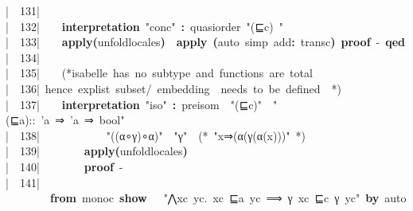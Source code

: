 \documentclass{article}
\newcommand{\syntaxCOMMENTA}[1]{\textcolor[rgb]{0.8,0.0,0.0}{#1}}
\newcommand{\syntaxKEYWORDA}[1]{\textcolor[rgb]{0.0,0.4,0.6}{\textbf{#1}}}
\newcommand{\syntaxKEYWORDC}[1]{\textcolor[rgb]{0.0,0.6,1.0}{\textbf{#1}}}
\newcommand{\syntaxLITERALA}[1]{\textcolor[rgb]{1.0,0.0,0.8}{#1}}
\newcommand{\syntaxOPERATOR}[1]{\textcolor[rgb]{0.0,0.0,0.0}{\textbf{#1}}}
\newcommand{\syntaxCOMMENTA}[1]{\textcolor[rgb]{0.8,0.0,0.0}{#1}}
\newcommand{\syntaxKEYWORDA}[1]{\textcolor[rgb]{0.0,0.4,0.6}{\textbf{#1}}}
\newcommand{\syntaxKEYWORDC}[1]{\textcolor[rgb]{0.0,0.6,1.0}{\textbf{#1}}}
\newcommand{\syntaxLITERALA}[1]{\textcolor[rgb]{1.0,0.0,0.8}{#1}}
\newcommand{\syntaxOPERATOR}[1]{\textcolor[rgb]{0.0,0.0,0.0}{\textbf{#1}}}
\newcommand{\syntaxCOMMENTA}[1]{\textcolor[rgb]{0.8,0.0,0.0}{#1}}
\newcommand{\syntaxKEYWORDA}[1]{\textcolor[rgb]{0.0,0.4,0.6}{\textbf{#1}}}
\newcommand{\syntaxKEYWORDC}[1]{\textcolor[rgb]{0.0,0.6,1.0}{\textbf{#1}}}
\newcommand{\syntaxLITERALA}[1]{\textcolor[rgb]{1.0,0.0,0.8}{#1}}
\newcommand{\syntaxOPERATOR}[1]{\textcolor[rgb]{0.0,0.0,0.0}{\textbf{#1}}}
\newcommand{\syntaxCOMMENTA}[1]{\textcolor[rgb]{0.8,0.0,0.0}{\textbf{#1}}}
\newcommand{\syntaxKEYWORDA}[1]{\textcolor[rgb]{0.0,0.4,0.6}{#1}}
\newcommand{\syntaxKEYWORDC}[1]{\textcolor[rgb]{0.0,0.6,1.0}{#1}}
\newcommand{\syntaxLITERALA}[1]{\textcolor[rgb]{1.0,0.0,0.8}{\textbf{#1}}}
\newcommand{\syntaxOPERATOR}[1]{\textcolor[rgb]{0.0,0.0,0.0}{#1}}
\newcommand{\syntaxCOMMENTA}[1]{\textcolor[rgb]{0.8,0.0,0.0}{#1}}
\newcommand{\syntaxKEYWORDA}[1]{\textcolor[rgb]{0.0,0.4,0.6}{\textbf{#1}}}
\newcommand{\syntaxKEYWORDC}[1]{\textcolor[rgb]{0.0,0.6,1.0}{\textbf{#1}}}
\newcommand{\syntaxLITERALA}[1]{\textcolor[rgb]{1.0,0.0,0.8}{#1}}
\newcommand{\syntaxOPERATOR}[1]{\textcolor[rgb]{0.0,0.0,0.0}{\textbf{#1}}}
\newcommand{\syntaxCOMMENTA}[1]{\textcolor[rgb]{0.8,0.0,0.0}{#1}}
\newcommand{\syntaxKEYWORDA}[1]{\textcolor[rgb]{0.0,0.4,0.6}{\textbf{#1}}}
\newcommand{\syntaxKEYWORDC}[1]{\textcolor[rgb]{0.0,0.6,1.0}{\textbf{#1}}}
\newcommand{\syntaxLITERALA}[1]{\textcolor[rgb]{1.0,0.0,0.8}{#1}}
\newcommand{\syntaxOPERATOR}[1]{\textcolor[rgb]{0.0,0.0,0.0}{\textbf{#1}}}
\newcommand{\syntaxCOMMENTA}[1]{\textcolor[rgb]{0.0,0.0,0.0}{#1}}
\newcommand{\syntaxKEYWORDA}[1]{\textcolor[rgb]{0.0,0.0,0.0}{#1}}
\newcommand{\syntaxKEYWORDC}[1]{\textcolor[rgb]{0.0,0.0,0.0}{#1}}
\newcommand{\gutter}[1]{\textcolor[rgb]{0,0,0}{{|}#1}}
\newcommand{\gutterH}[1]{\textcolor[rgb]{1,0,0}{{|}#1}}
\begin{document}
\gutter{\ \ 131{|}\ }{\ }{\ }{\ }\hspace*{\fill}\\
\gutter{\ \ 132{|}\ }{\ }{\ }{\ }\syntaxKEYWORDA{interpretation}{\ }\syntaxLITERALA{"conc"}{\ }\syntaxOPERATOR{:}{\ }quasi\usebox{\underscorebox}order{\ }\syntaxLITERALA{"(⊑c){\ }"}{\ }\hspace*{\fill}\\
\gutter{\ \ 133{|}\ }{\ }{\ }{\ }\syntaxKEYWORDA{apply}\syntaxOPERATOR{(}unfold\usebox{\underscorebox}locales\syntaxOPERATOR{)}{\ }{\ }\syntaxKEYWORDA{apply}{\ }\syntaxOPERATOR{(}auto{\ }simp{\ }add\syntaxOPERATOR{:}{\ }transc\syntaxOPERATOR{)}{\ }\syntaxKEYWORDA{proof}{\ }{-}{\ }\syntaxKEYWORDA{qed}\hspace*{\fill}\\
\gutter{\ \ 134{|}\ }\hspace*{\fill}\\
\gutterH{\ \ 135{|}\ }{\ }{\ }{\ }\syntaxCOMMENTA{(*isabelle{\ }has{\ }no{\ }subtype{\ }and{\ }functions{\ }are{\ }total}\hspace*{\fill}\\
\gutter{\ \ 136{|}\ }\syntaxCOMMENTA{hence{\ }explist{\ }subset/{\ }embedding{\ }{\ }needs{\ }to{\ }be{\ }defined{\ }{\ }*)}\hspace*{\fill}\\
\gutter{\ \ 137{|}\ }{\ }{\ }{\ }\syntaxKEYWORDA{interpretation}{\ }\syntaxLITERALA{"iso"}{\ }\syntaxOPERATOR{:}{\ }pre\usebox{\underscorebox}isom{\ }{\ }\syntaxLITERALA{"(⊑c)"}{\ }{\ }\syntaxLITERALA{"(⊑a)::{\ }'a{\ }⇒{\ }'a{\ }⇒{\ }bool"}{\ }{\ }\hspace*{\fill}\\
\gutter{\ \ 138{|}\ }{\ }{\ }{\ }{\ }{\ }{\ }{\ }{\ }{\ }{\ }{\ }\syntaxLITERALA{"((α∘γ)∘α)"}{\ }{\ }\syntaxLITERALA{"γ"}{\ }{\ }\syntaxCOMMENTA{(*{\ }"x⇒(α(γ(α(x)))"{\ }*)}\hspace*{\fill}\\
\gutter{\ \ 139{|}\ }{\ }{\ }{\ }{\ }{\ }{\ }{\ }\syntaxKEYWORDA{apply}\syntaxOPERATOR{(}unfold\usebox{\underscorebox}locales\syntaxOPERATOR{)}{\ }{\ }\hspace*{\fill}\\
\gutterH{\ \ 140{|}\ }{\ }{\ }{\ }{\ }{\ }{\ }{\ }\syntaxKEYWORDA{proof}{\ }{-}{\ }{\ }{\ }{\ }{\ }{\ }{\ }{\ }{\ }{\ }{\ }{\ }{\ }{\ }{\ }{\ }{\ }{\ }{\ }{\ }{\ }{\ }{\ }{\ }{\ }{\ }{\ }{\ }{\ }\hspace*{\fill}\\
\gutter{\ \ 141{|}\ }{\ }{\ }{\ }{\ }{\ }{\ }{\ }\syntaxKEYWORDA{from}{\ }monoc{\ }\syntaxKEYWORDC{show}{\ }{\ }{\ }\syntaxLITERALA{"⋀xc{\ }yc.{\ }xc{\ }⊑a{\ }yc{\ }⟹{\ }γ{\ }xc{\ }⊑c{\ }γ{\ }yc"}{\ }\syntaxKEYWORDA{by}{\ }auto\hspace*{\fill}\\
\end{document}
